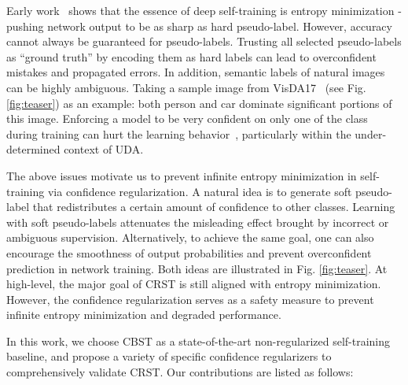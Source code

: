 \documentclass[10pt,twocolumn,letterpaper]{article}
\theoremstyle{plain}
\begin{document}
Early work~\cite{lee2013pseudo} shows that the essence of deep self-training is entropy minimization - pushing network output to be as sharp as hard pseudo-label. However,  accuracy cannot always be guaranteed for pseudo-labels. Trusting all selected pseudo-labels as ``ground truth'' by encoding them as hard labels can lead to overconfident mistakes and propagated errors. In addition, semantic labels of natural images can be highly ambiguous. Taking a sample image from VisDA17~\cite{peng2018visda} (see Fig. \ref{fig:teaser}) as an example: both person and car dominate significant portions of this image. Enforcing a model to be very confident on only one of the class during training can hurt the learning behavior~\cite{bagherinezhad2018label}, particularly within the under-determined context of UDA.

The above issues motivate us to prevent infinite entropy minimization in self-training via confidence regularization. A natural idea is to generate soft pseudo-label that redistributes a certain amount of confidence to other classes. Learning with soft pseudo-labels attenuates the misleading effect brought by incorrect or ambiguous supervision. Alternatively, to achieve the same goal, one can also encourage the smoothness of output probabilities and prevent overconfident prediction in network training. Both ideas are illustrated in Fig. \ref{fig:teaser}. At high-level, the major goal of CRST is still aligned with entropy minimization. However, the confidence regularization serves as a safety measure to prevent infinite entropy minimization and degraded performance.

In this work, we choose CBST \cite{Zou_2018_ECCV} as a state-of-the-art non-regularized self-training baseline, and propose a variety of specific confidence regularizers to comprehensively validate CRST. Our contributions are listed as follows:
\end{document}
